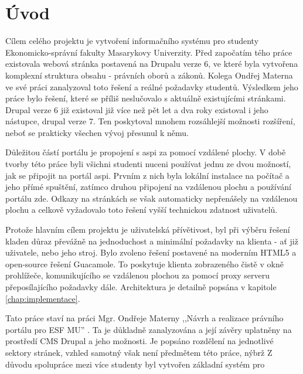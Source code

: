 \chapter{Úvod}
Cílem celého projektu je vytvoření informačního systému pro studenty Ekonomicko-správní fakulty Masarykovy Univerzity. Před započatím tého práce existovala webová stránka postavená na Drupalu verze 6, ve které byla vytvořena komplexní struktura obsahu - právních oborů a zákonů. Kolega Ondřej Materna ve své práci zanalyzoval toto řešení a reálné požadavky studentů. Výsledkem jeho práce bylo řešení, které se příliš neslučovalo s aktuálně existujícími stránkami. Drupal verze 6 již existoval již více než pět let a dva roky existoval i jeho nástupce, drupal verze 7\cite{website:wiki:drupal}. Ten poskytoval mnohem rozsáhlejší možnosti rozšíření, neboť se prakticky všechen vývoj přesunul k němu. 

Důležitou částí portálu je propojení s \gls{aspi} za pomocí vzdálené plochy. V době tvorby této práce byli všichni studenti nuceni používat jednu ze dvou možností, jak se připojit na portál \gls{aspi}. Prvním z nich byla lokální instalace na počítač a jeho přímé spuštění, zatímco druhou připojení na vzdálenou plochu a používání portálu zde. Odkazy na stránkách se však automaticky nepřenášely na vzdálenou plochu a celkově vyžadovalo toto řešení vyšší technickou zdatnost uživatelů.

Protože hlavním cílem projektu je uživatelská přívětivost, byl při výběru řešení kladen důraz převážně na jednoduchost a minimální požadavky na klienta - ať již uživatele, nebo jeho stroj. Bylo zvoleno řešení postavené na moderním HTML5 a open-source řešení Guacamole. To poskytuje klienta zobrazeného čistě v okně prohlížeče, komunikujícího se vzdálenou plochou za pomocí proxy serveru přeposílajícího požadavky dále. Architektura je detailně popsána v kapitole \ref{chap:implementace}.

Tato práce staví na práci Mgr. Ondřeje Materny ,,Návrh a realizace právního portálu pro ESF MU'' \cite{omaterna2013}. Ta je důkladně zanalyzována a její závěry uplatněny na prostředí CMS Drupal a jeho možnosti. Je popsáno rozdělení na jednotlivé sektory stránek, vzhled samotný však není předmětem této práce, nýbrž %
Z důvodu spolupráce mezi více studenty byl vytvořen základní systém pro 

